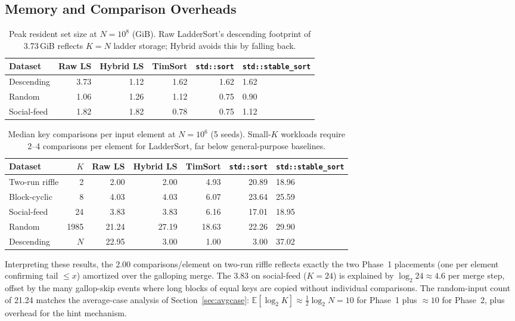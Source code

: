 \documentclass[12pt,a4paper]{article}
\theoremstyle{plain}
\theoremstyle{definition}
\begin{document}
\subsection{Memory and Comparison Overheads}
\label{sec:overhead}

\begin{table}[H]
\centering\small
\caption{Peak resident set size at $N=10^8$ (GiB). Raw LadderSort's
  descending footprint of 3.73\,GiB reflects $K=N$ ladder storage; Hybrid
  avoids this by falling back.}
\label{tab:phase5-memory}
\begin{tabularx}{\linewidth}{@{}lrrrrX@{}}
\toprule
Dataset & Raw LS & Hybrid LS & TimSort & \texttt{std::sort} & \texttt{std::stable\_sort} \\
\midrule
Descending  & 3.73 & 1.12 & 1.62 & 1.62 & 1.62 \\
Random      & 1.06 & 1.26 & 1.12 & 0.75 & 0.90 \\
Social-feed & 1.82 & 1.82 & 0.78 & 0.75 & 1.12 \\
\bottomrule
\end{tabularx}
\end{table}

\begin{table}[H]
\centering\small
\caption{Median key comparisons per input element at $N=10^6$ (5 seeds).
  Small-$K$ workloads require 2--4 comparisons per element for LadderSort,
  far below general-purpose baselines.}
\label{tab:phase5-comparisons}
\begin{tabularx}{\linewidth}{@{}lrrrrrX@{}}
\toprule
Dataset & $K$ & Raw LS & Hybrid LS & TimSort & \texttt{std::sort} & \texttt{std::stable\_sort} \\
\midrule
Two-run riffle & 2    & 2.00  & 2.00  & 4.93  & 20.89 & 18.96 \\
Block-cyclic   & 8    & 4.03  & 4.03  & 6.07  & 23.64 & 25.59 \\
Social-feed    & 24   & 3.83  & 3.83  & 6.16  & 17.01 & 18.95 \\
Random         & 1985 & 21.24 & 27.19 & 18.63 & 22.26 & 29.90 \\
Descending     & $N$  & 22.95 & 3.00  & 1.00  & 3.00  & 37.02 \\
\bottomrule
\end{tabularx}
\end{table}

Interpreting these results, the 2.00 comparisons/element on two-run riffle reflects exactly the two
Phase~1 placements (one per element confirming tail $\le x$) amortized
over the galloping merge.  The 3.83 on social-feed ($K=24$) is explained
by $\log_2 24 \approx 4.6$ per merge step, offset by the many gallop-skip
events where long blocks of equal keys are copied without individual
comparisons.  The random-input count of 21.24 matches the average-case
analysis of Section~\ref{sec:avgcase}: $\mathbb{E}[\log_2 K] \approx
\frac{1}{2}\log_2 N = 10$ for Phase~1 plus $\approx 10$ for Phase~2, plus
overhead for the hint mechanism.
\end{document}
